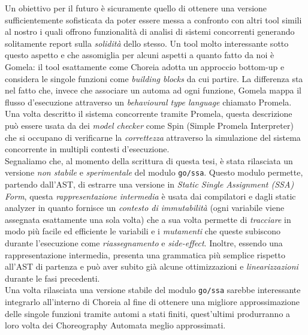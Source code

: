 Un obiettivo per il futuro è sicuramente quello di ottenere una versione sufficientemente sofisticata da poter essere messa a confronto con altri tool simili al nostro i quali offrono funzionalità di analisi di sistemi concorrenti generando solitamente report sulla \emph{solidità} dello stesso. Un tool molto interessante sotto questo aspetto e che assomiglia per alcuni aspetti a quanto fatto da noi è Gomela\cite{Gomela}: il tool esattamente come Choreia adotta un approccio bottom-up e considera le singole funzioni come \emph{building blocks} da cui partire. La differenza sta nel fatto che, invece che associare un automa ad ogni funzione, Gomela mappa il flusso d'esecuzione attraverso un \emph{behavioural type language} chiamato Promela\cite{Promela}. Una volta descritto il sistema concorrente tramite Promela, questa descrizione può essere usata da dei \emph{model checker} come Spin\cite{Spin} (Simple Promela Interpreter) che si occupano di verificarne la \emph{correttezza} attraverso la simulazione del sistema concorrente in multipli contesti d'esecuzione.\bigskip \\
Segnaliamo che, al momento della scrittura di questa tesi, è stata rilasciata un versione \emph{non stabile} e \emph{sperimentale} del modulo \texttt{go/ssa}. Questo modulo permette, partendo dall'AST, di estrarre una versione in \emph{Static Single Assignment (SSA) Form}\cite{SSA_Form}, questa \emph{rappresentazione intermedia} è usata dai compilatori e dagli static analyzer in quanto fornisce un \emph{contesto di immutabilità} (ogni variabile viene assegnata esattamente una sola volta) che a sua volta permette di \emph{tracciare} in modo più facile ed efficiente le variabili e i \emph{mutamenti} che queste subiscono durante l'esecuzione come \emph{riassegnamento} e \emph{side-effect}. Inoltre, essendo una rappresentazione intermedia, presenta una grammatica più semplice rispetto all'AST di partenza e può aver subito già alcune ottimizzazioni e \emph{linearizzazioni} durante le fasi precedenti.\\
Una volta rilasciata una versione stabile del modulo \texttt{go/ssa} sarebbe interessante integrarlo all'interno di Choreia al fine di ottenere una migliore approssimazione delle singole funzioni tramite automi a stati finiti, quest'ultimi produrranno a loro volta dei Choreography Automata meglio approssimati.
